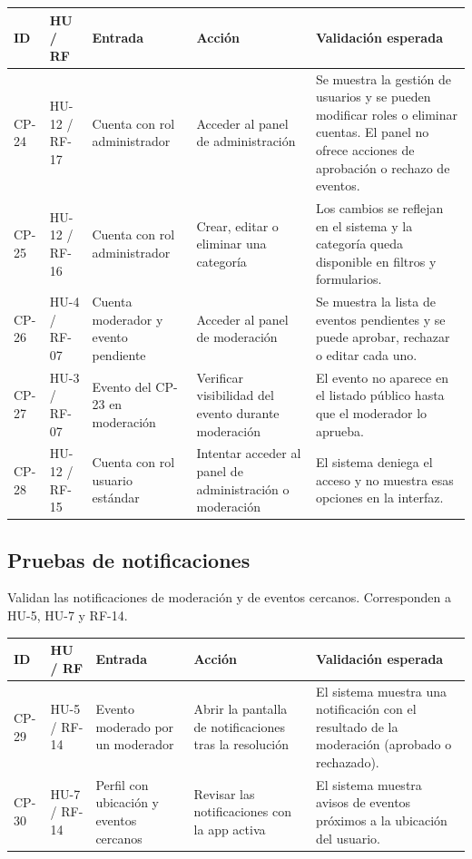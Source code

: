 \begin{longtable}{|L{1.3cm}|L{1.6cm}|L{3cm}|L{3.8cm}|L{4.3cm}|}
\hline
\textbf{ID} & \textbf{HU / RF} & \textbf{Entrada} & \textbf{Acción} & \textbf{Validación esperada} \\
\hline
{}\label{cp:24}CP-24 & HU-12 / RF-17 & Cuenta con rol administrador & Acceder al panel de administración & Se muestra la gestión de usuarios y se pueden modificar roles o eliminar cuentas. El panel no ofrece acciones de aprobación o rechazo de eventos. \\
\hline
{}\label{cp:25}CP-25 & HU-12 / RF-16 & Cuenta con rol administrador & Crear, editar o eliminar una categoría & Los cambios se reflejan en el sistema y la categoría queda disponible en filtros y formularios. \\
\hline
{}\label{cp:26}CP-26 & HU-4 / RF-07 & Cuenta moderador y evento pendiente & Acceder al panel de moderación & Se muestra la lista de eventos pendientes y se puede aprobar, rechazar o editar cada uno. \\
\hline
{}\label{cp:27}CP-27 & HU-3 / RF-07 & Evento del CP-23 en moderación & Verificar visibilidad del evento durante moderación & El evento no aparece en el listado público hasta que el moderador lo aprueba. \\
\hline
{}\label{cp:28}CP-28 & HU-12 / RF-15 & Cuenta con rol usuario estándar & Intentar acceder al panel de administración o moderación & El sistema deniega el acceso y no muestra esas opciones en la interfaz. \\
\hline
\end{longtable}

\subsection{Pruebas de notificaciones}

Validan las notificaciones de moderación y de eventos cercanos. Corresponden a HU-5, HU-7 y RF-14.

\begin{longtable}{|L{1.3cm}|L{1.6cm}|L{3cm}|L{3.8cm}|L{4.3cm}|}
\hline
\textbf{ID} & \textbf{HU / RF} & \textbf{Entrada} & \textbf{Acción} & \textbf{Validación esperada} \\
\hline
{}\label{cp:29}CP-29 & HU-5 / RF-14 & Evento moderado por un moderador & Abrir la pantalla de notificaciones tras la resolución & El sistema muestra una notificación con el resultado de la moderación (aprobado o rechazado). \\
\hline
{}\label{cp:30}CP-30 & HU-7 / RF-14 & Perfil con ubicación y eventos cercanos & Revisar las notificaciones con la app activa & El sistema muestra avisos de eventos próximos a la ubicación del usuario. \\
\hline
\end{longtable}

